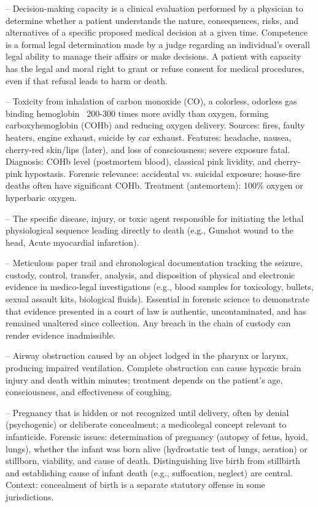 -- Decision-making capacity is a clinical evaluation performed by a physician to determine whether a patient understands the nature, consequences, risks, and alternatives of a specific proposed medical decision at a given time. Competence is a formal legal determination made by a judge regarding an individual's overall legal ability to manage their affairs or make decisions. A patient with capacity has the legal and moral right to grant or refuse consent for medical procedures, even if that refusal leads to harm or death.


-- Toxicity from inhalation of carbon monoxide (CO), a colorless, odorless gas binding hemoglobin ~200-300 times more avidly than oxygen, forming carboxyhemoglobin (COHb) and reducing oxygen delivery. Sources: fires, faulty heaters, engine exhaust, suicide by car exhaust. Features: headache, nausea, cherry-red skin/lips (later), and loss of consciousness; severe exposure fatal. Diagnosis: COHb level (postmortem blood), classical pink lividity, and cherry-pink hypostasis. Forensic relevance: accidental vs. suicidal exposure; house-fire deaths often have significant COHb. Treatment (antemortem): 100\% oxygen or hyperbaric oxygen.

-- The specific disease, injury, or toxic agent responsible for initiating the lethal physiological sequence leading directly to death (e.g., Gunshot wound to the head, Acute myocardial infarction).

-- Meticulous paper trail and chronological documentation tracking the seizure, custody, control, transfer, analysis, and disposition of physical and electronic evidence in medico-legal investigations (e.g., blood samples for toxicology, bullets, sexual assault kits, biological fluids). Essential in forensic science to demonstrate that evidence presented in a court of law is authentic, uncontaminated, and has remained unaltered since collection. Any breach in the chain of custody can render evidence inadmissible.

-- Airway obstruction caused by an object lodged in the pharynx or larynx, producing impaired ventilation. Complete obstruction can cause hypoxic brain injury and death within minutes; treatment depends on the patient's age, consciousness, and effectiveness of coughing.

-- Pregnancy that is hidden or not recognized until delivery, often by denial (psychogenic) or deliberate concealment; a medicolegal concept relevant to infanticide. Forensic issues: determination of pregnancy (autopsy of fetus, hyoid, lungs), whether the infant was born alive (hydrostatic test of lungs, aeration) or stillborn, viability, and cause of death. Distinguishing live birth from stillbirth and establishing cause of infant death (e.g., suffocation, neglect) are central. Context: concealment of birth is a separate statutory offense in some jurisdictions.

